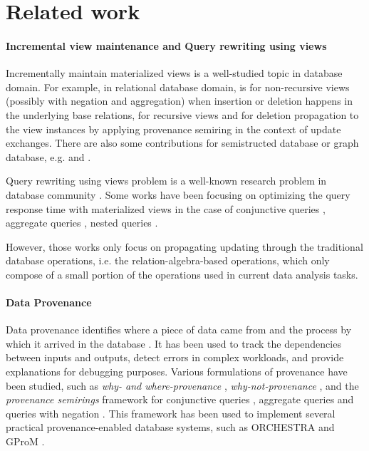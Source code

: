 \section{Related work}

\paragraph{Incremental view maintenance and Query rewriting using views} Incrementally maintain materialized views is a well-studied topic in database domain. For example, in relational database domain, \cite{gupta1993maintaining} is for non-recursive views (possibly with negation and aggregation) when insertion or deletion happens in the underlying base relations, \cite{dong2000incremental} for recursive views and \cite{green2007update} for deletion propagation to the view instances by applying provenance semiring \cite{green2007provenance} in the context of update exchanges. There are also some contributions for semistructed database or graph database, e.g. \cite{liefke2000view} and \cite{abiteboul1998incremental}. 

Query rewriting using views problem is a well-known research problem in database community \cite{halevy2001answering}. Some works have been focusing on optimizing the query response time with materialized views in the case of conjunctive queries \cite{chandra1977optimal, chaudhuri1995optimizing, pottinger2000scalable, afrati2007using}, aggregate queries \cite{cohen2007deciding, cohen1999rewriting, srivastava1996answering, galindo2001orthogonal}, nested queries \cite{zaharioudakis2000answering}.

However, those works only focus on propagating updating through the traditional database operations, i.e. the relation-algebra-based operations, which only compose of a small portion of the operations used in current data analysis tasks. 

\paragraph{Data Provenance} Data provenance identifies where a piece of data came from and the process by which it arrived in the database \cite{buneman2001and}.  It has been used to track the dependencies between inputs and outputs, detect errors in complex workloads, and provide explanations for debugging purposes. Various formulations of provenance have been studied, such as \textit{why- and where-provenance} \cite{buneman2001and}, \textit{why-not-provenance} \cite{chapman2009not}, and the \textit{provenance semirings} framework %
for conjunctive queries \cite{green2007provenance}, aggregate queries \cite{amsterdamer2011provenance} and queries with negation \cite{xu2018provenance}.  This framework has been used to implement several practical provenance-enabled database systems, such as ORCHESTRA \cite{ives2008orchestra} and GProM \cite{arab2018gprom}. 

